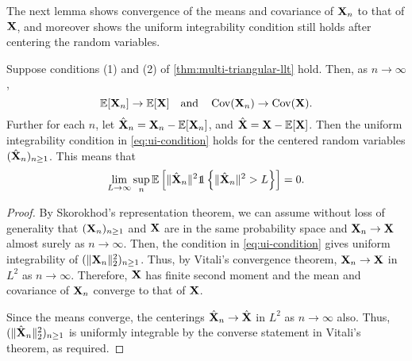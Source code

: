 The next lemma shows convergence of the means and covariance of ${\mathbf X}_n$ to that of ${\mathbf X}$, and moreover shows the uniform integrability condition still holds after centering the random variables.
\begin{lemma}
    \label{lem:l2-cvgc-corrs}
    Suppose conditions (1) and (2) of \cref{thm:multi-triangular-llt} hold. Then, as $n \to \infty$, 
    \begin{equation*}
        {\mathbb E}[{\mathbf X}_n] \to {\mathbb E}[{\mathbf X}] \quad \text{and} \quad \operatorname{Cov}({\mathbf X}_n) \to \operatorname{Cov}({\mathbf X}).
    \end{equation*}
    Further for each $n$, let $\hat{{\mathbf X}}_n = {\mathbf X}_n - {\mathbb E}[{\mathbf X}_n]$, and $\hat{{\mathbf X}} = {\mathbf X} - {\mathbb E}[{\mathbf X}]$. Then the uniform integrability condition in \cref{eq:ui-condition} holds for the centered random variables $(\hat{{\mathbf X}}_n)_{n \geq 1}$. This means that
    \begin{equation*}
        \label{eq:ui-mean-center}
        \lim_{L \to \infty} \sup_n \E\left[
            \norm{\hat{\vX}_n}^2
            \one \left\{ \norm{\hat{\vX}_n}^2 > L \right\}
        \right] = 0.
    \end{equation*}
\end{lemma}
\begin{proof}
    By Skorokhod's representation theorem, we can assume without loss of generality that $({\mathbf X}_n)_{n \geq 1}$ and ${\mathbf X}$ are in the same probability space and ${\mathbf X}_n \to {\mathbf X}$ almost surely as $n \to \infty$. Then, the condition in \cref{eq:ui-condition} gives uniform integrability of $(\lVert{\mathbf X}_n\rVert_2^2)_{n \geq 1}$. Thus, by Vitali's convergence theorem, ${\mathbf X}_n \to {\mathbf X}$ in $L^2$ as $n \to \infty$. Therefore, ${\mathbf X}$ has finite second moment and the mean and covariance of ${\mathbf X}_n$ converge to that of ${\mathbf X}$.

    Since the means converge, the centerings $\hat{{\mathbf X}}_n \to \hat{{\mathbf X}}$ in $L^2$ as $n \to \infty$ also. Thus, $(\lVert\hat{{\mathbf X}}_n\rVert_2^2)_{n \geq 1}$ is uniformly integrable by the converse statement in Vitali's theorem, as required.
\end{proof}

